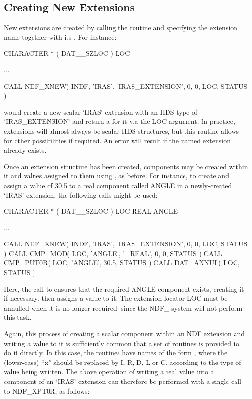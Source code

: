 \documentclass[twoside,11pt,nolof]{starlink}
\begin{document}
\subsection{\label{ss:creatingnewextensions}Creating New Extensions}

New extensions are created by calling the routine  and specifying
the extension name together with its .
For instance:

\small
\begin{terminalv}
      CHARACTER * ( DAT__SZLOC ) LOC

      ...

      CALL NDF_XNEW( INDF, 'IRAS', 'IRAS_EXTENSION', 0, 0, LOC, STATUS )
\end{terminalv}
\normalsize

would create a new scalar `IRAS' extension with an HDS type of
`IRAS\_EXTENSION' and return a 
for it via the LOC argument.
In practice, extensions will almost always be scalar HDS structures, but
this routine allows for other possibilities if required.
An error will result if the named extension already exists.

Once an extension structure has been created, components may be created
within it and values assigned to them using , as before.
For instance, to create and assign a value of 30.5 to a real component
called ANGLE in a newly-created `IRAS' extension, the following calls might
be used:

\small
\begin{terminalv}
      CHARACTER * ( DAT__SZLOC ) LOC
      REAL ANGLE

      ...

      CALL NDF_XNEW( INDF, 'IRAS', 'IRAS_EXTENSION', 0, 0, LOC, STATUS )
      CALL CMP_MOD( LOC, 'ANGLE', '_REAL', 0, 0, STATUS )
      CALL CMP_PUT0R( LOC, 'ANGLE', 30.5, STATUS )
      CALL DAT_ANNUL( LOC, STATUS )
\end{terminalv}
\normalsize

Here, the call to  ensures that the
required ANGLE component exists, creating it if necessary.
 then assigns a value to it.
The extension locator LOC must be annulled when it is no longer required,
since the NDF\_ system will not perform this task.

Again, this process of creating a scalar component within an NDF extension
and writing a value to it is sufficiently common that a set of routines is
provided to do it directly.
In this case, the routines have names of the form , where the
(lower-case) ``x'' should be replaced by I, R, D, L or C, according to the
type of value being written.
The above operation of writing a real value into a component of an `IRAS'
extension can therefore be performed with a single call to NDF\_XPT0R, as
follows:
\end{document}
